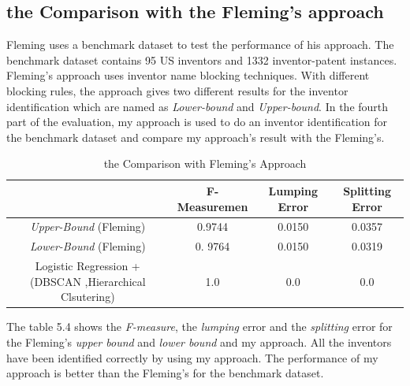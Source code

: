 \subsection{the Comparison with the Fleming's approach}
Fleming uses a benchmark dataset to test the performance of his approach. The benchmark dataset contains 95 US inventors and 1332 inventor-patent instances.  Fleming's approach uses inventor name blocking techniques.  With different blocking rules, the approach gives two different results for the inventor identification which are named as \emph{Lower-bound} and \emph{Upper-bound}. In the fourth part of the evaluation, my approach is used to do an inventor identification for the benchmark dataset and compare my approach's result with the Fleming's. \newline
\begin{table}
\scriptsize
\begin{tabular}{|c|c|c|c|}
\hline
&F-Measuremen&Lumping Error&Splitting Error\\
\hline

\emph{Upper-Bound} (Fleming)&0.9744 &0.0150&0.0357\\

\hline

\emph{Lower-Bound} (Fleming)&0. 9764& 0.0150& 0.0319\\
\hline
Logistic Regression + (DBSCAN ,Hierarchical Clsutering) & 1.0 &0.0&0.0\\
\hline
\end{tabular}
\caption{the Comparison with Fleming's Approach}
\end{table}

The table 5.4 shows the \emph{F-measure}, the \emph{lumping} error and the \emph{splitting} error for the Fleming's \emph{upper bound} and \emph{lower bound} and my approach. All the inventors have been identified correctly by using my approach. The performance of my approach is better than the Fleming's for the benchmark dataset. 

